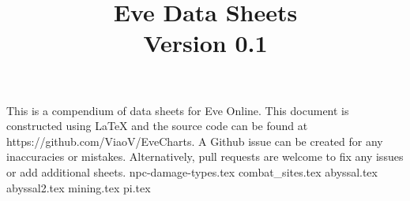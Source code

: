 
\title{Eve Data Sheets\\
\large Version 0.1}
\author{}

\maketitle
This is a compendium of data sheets for Eve Online. This document is constructed
using LaTeX and the source code can be found at 
https://github.com/ViaoV/EveCharts. A Github issue can be created for any
inaccuracies or mistakes. Alternatively, pull requests are welcome to fix any
issues or add additional sheets.
\newpage
\tableofcontents
\setup
\newpage
\small
{npc-damage-types.tex}
\newpage
{combat_sites.tex}
\newpage
{abyssal.tex}
\newpage
{abyssal2.tex}
\newpage
{mining.tex}
\newpage
{pi.tex}
%
%
%
%
%




